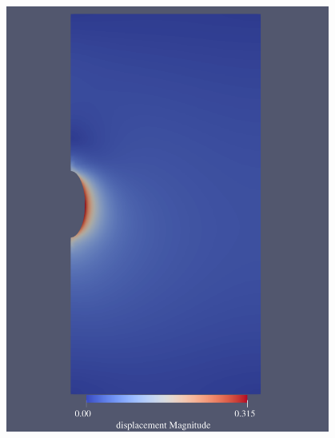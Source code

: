 \begin{figure}[ht!]
{\begin{minipage}{6.2cm}
            \includegraphics[width=0.95\textwidth]{img/chap5/位移/工况二位移云图.pdf}
        \end{minipage}
    }
\end{figure}
